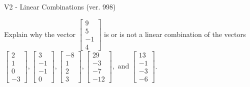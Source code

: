 \begin{exercise}
  \begin{exerciseTitle}V2 - Linear Combinations (ver. 998)\end{exerciseTitle}
  \begin{exerciseStatement}
    Explain why the vector \(\left[\begin{array}{c}
9 \\
5 \\
-1 \\
4
\end{array}\right]\)  is or is not a linear 
	combination of the vectors \(\left[\begin{array}{c}
2 \\
1 \\
0 \\
-3
\end{array}\right] , \left[\begin{array}{c}
3 \\
-1 \\
-1 \\
0
\end{array}\right] , \left[\begin{array}{c}
-8 \\
1 \\
2 \\
3
\end{array}\right] , \left[\begin{array}{c}
29 \\
-3 \\
-7 \\
-12
\end{array}\right] , \text{ and } \left[\begin{array}{c}
13 \\
-1 \\
-3 \\
-6
\end{array}\right]\).
	



\end{exerciseStatement}
\end{exercise}
